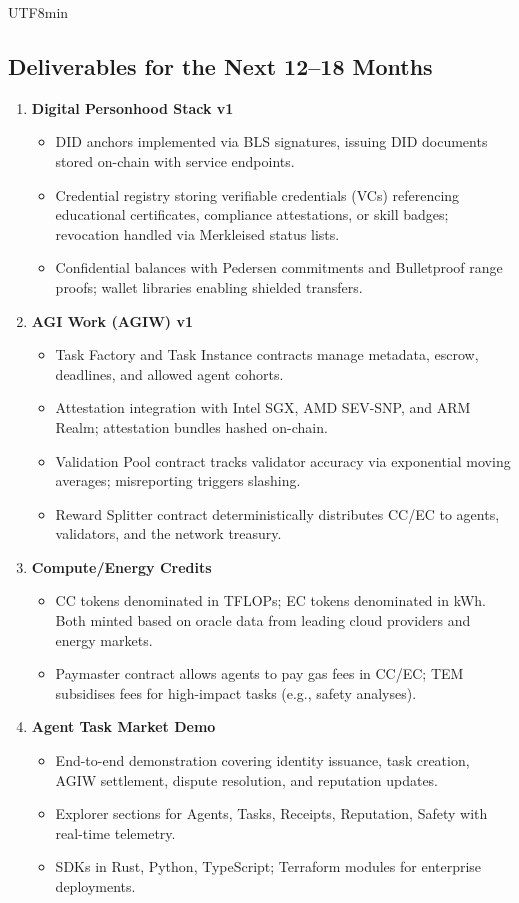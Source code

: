 \documentclass[11pt]{article}
\begin{document}
\begin{CJK}{UTF8}{min}
\subsection{Deliverables for the Next 12--18 Months}
\begin{enumerate}[label=\textbf{D\arabic*.}, leftmargin=*]
  \item \textbf{Digital Personhood Stack v1}
  \begin{itemize}[noitemsep]
    \item DID anchors implemented via BLS signatures, issuing DID documents stored on-chain with service endpoints.
    \item Credential registry storing verifiable credentials (VCs) referencing educational certificates, compliance attestations, or skill badges; revocation handled via Merkleised status lists.
    \item Confidential balances with Pedersen commitments and Bulletproof range proofs; wallet libraries enabling shielded transfers.
  \end{itemize}
  \item \textbf{AGI Work (AGIW) v1}
  \begin{itemize}[noitemsep]
    \item Task Factory and Task Instance contracts manage metadata, escrow, deadlines, and allowed agent cohorts.
    \item Attestation integration with Intel SGX, AMD SEV-SNP, and ARM Realm; attestation bundles hashed on-chain.
    \item Validation Pool contract tracks validator accuracy via exponential moving averages; misreporting triggers slashing.
    \item Reward Splitter contract deterministically distributes CC/EC to agents, validators, and the network treasury.
  \end{itemize}
  \item \textbf{Compute/Energy Credits}
  \begin{itemize}[noitemsep]
    \item CC tokens denominated in TFLOPs; EC tokens denominated in kWh. Both minted based on oracle data from leading cloud providers and energy markets.
    \item Paymaster contract allows agents to pay gas fees in CC/EC; TEM subsidises fees for high-impact tasks (e.g., safety analyses).
  \end{itemize}
  \item \textbf{Agent Task Market Demo}
  \begin{itemize}[noitemsep]
    \item End-to-end demonstration covering identity issuance, task creation, AGIW settlement, dispute resolution, and reputation updates.
    \item Explorer sections for Agents, Tasks, Receipts, Reputation, Safety with real-time telemetry.
    \item SDKs in Rust, Python, TypeScript; Terraform modules for enterprise deployments.
  \end{itemize}
\end{enumerate}


\end{CJK}
\end{document}
